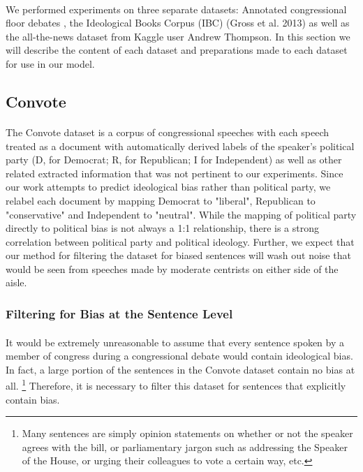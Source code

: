 \documentclass[10pt,a4paper,onecolumn]{article}
\begin{document}
\paragraph{}
We performed experiments on three separate datasets: Annotated congressional floor debates \cite{convote}, the Ideological Books Corpus (IBC) (Gross et al. 2013) as well as the all-the-news dataset from Kaggle user Andrew Thompson. In this section we will describe the content of each dataset and preparations made to each dataset for use in our model.


\subsection{Convote}
\paragraph{}
The Convote dataset is a corpus of congressional speeches with each speech treated as a document with automatically derived labels of the speaker's political party (D, for Democrat; R, for Republican; I for Independent) as well as other related extracted information that was not pertinent to our experiments. Since our work attempts to predict ideological bias rather than political party, we relabel each document by mapping Democrat to "liberal", Republican to "conservative" and Independent to "neutral". While the mapping of political party directly to political bias is not always a 1:1 relationship, there is a strong correlation between political party and political ideology. Further, we expect that our method for filtering the dataset for biased sentences will wash out noise that would be seen from speeches made by moderate centrists on either side of the aisle.

\subsubsection{Filtering for Bias at the Sentence Level}
\paragraph{}
It would be extremely unreasonable to assume that every sentence spoken by a member of congress during a congressional debate would contain ideological bias. In fact, a large portion of the sentences in the Convote dataset contain no bias at all.
\footnote{Many sentences are simply opinion statements on whether or not the speaker agrees with the bill, or parliamentary jargon such as addressing the Speaker of the House, or urging their colleagues to vote a certain way, etc.} Therefore, it is necessary to filter this dataset for sentences that explicitly contain bias. 
\end{document}
